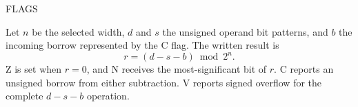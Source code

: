 \begin{manualflageffects}{FLAGS}
\end{manualflageffects}

Let \(n\) be the selected width, \(d\) and \(s\) the unsigned operand bit patterns, and \(b\) the incoming borrow represented by the C flag. The written result is
\[
  r = (d - s - b) \bmod 2^n .
\]
Z is set when \(r=0\), and N receives the most-significant bit of \(r\). C reports an unsigned borrow from either subtraction. V reports signed overflow for the complete \(d-s-b\) operation.
